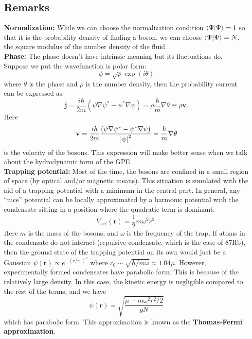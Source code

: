 \documentclass{book}
\theoremstyle{definition}
\newcommand{\f}[2]{\frac{#1}{#2}}
\newcommand{\lp}{\left(}
\newcommand{\rp}{\right)}
\begin{document}
\subsection*{Remarks}

\noindent \textbf{Normalization:} While we can choose the normalization condition $\braket{\Psi} = 1$ so that it is the probability density of finding a boson, we can choose $\braket{\Psi} = N$, the square modulus of the number density of the fluid. \\

\noindent \textbf{Phase:} The phase doesn't have intrinsic meaning but its fluctuations do. Suppose we put the wavefunction is polar form:
\begin{equation*}
\psi = \sqrt{\rho} \exp(i\theta)
\end{equation*}
where $\theta$ is the phase and $\rho$ is the number density, then the probability current can be expressed as 
\begin{equation*}
\mathbf{j} = \f{i\hbar}{2m} \lp \psi \nabla \psi^* - \psi^* \nabla \psi \rp = \rho \f{\hbar }{m} \nabla \theta \equiv \rho \mathbf{v}.
\end{equation*}
Here
\begin{equation*}
\mathbf{v} = \f{i\hbar}{2m} \f{(\psi \nabla \psi^* - \psi^*\nabla \psi )}{\abs{\psi}^2}  =\f{\hbar}{m}\nabla \theta
\end{equation*}
is the velocity of the bosons. This expression will make better sense when we talk about the hydrodynamic form of the GPE.\\


\noindent \textbf{Trapping potential:}  Most of the time, the bosons are confined in a
small region of space (by optical and/or magnetic means). This situation is simulated with the aid of a trapping potential with a minimum in the central part. In general, any ``nice'' potential can be locally approximated by a harmonic potential with the condensate sitting in a position where the quadratic term is dominant:
\begin{equation*}
V_{ext}(\mathbf{r}) = \f{1}{2}m\omega^2 r^2.
\end{equation*}
Here $m$ is the mass of the bosons, and $\omega$ is the frequency of the trap. If atoms in the condensate do not interact (repulsive condensate, which is the case of 87Rb), then the ground state of the trapping potential on its own would just be a Gaussian $\psi(\mathbf{r})\propto e^{-(r/r_0)^2}$ where $r_0 \sim \sqrt{\hbar/m\omega} \approx 1.04 \mu$. However, experimentally formed condensates have parabolic form. This is because of the relatively large density. In this case, the kinetic energy is negligible compared to the rest of the terms, and we have
\begin{equation*}
\psi(\mathbf{r}) = \sqrt{\f{\mu - m\omega^2 r^2/2}{gN}}
\end{equation*}
which has parabolic form. This approximation is known as the \textbf{Thomas-Fermi approximation}. 
\end{document}
